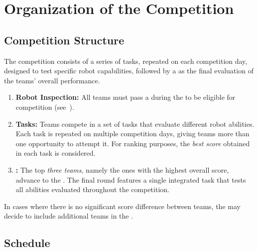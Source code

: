 \section{Organization of the Competition}\label{sec:procedure_during_competition}

\subsection{Competition Structure}\label{rule:structure}

The competition consists of a series of tasks, repeated on each competition day, designed to test specific robot capabilities, followed by a \FINAL{} as the final evaluation of the teams' overall performance.


\begin{enumerate}
	\item \textbf{Robot Inspection:} 
	All teams must pass a \RobotInspection{} during the \SetupDays{} to be eligible for competition (see~).

	\item \textbf{Tasks:}
	Teams compete in a set of tasks that evaluate different robot abilities.
	Each task is repeated on multiple competition days, giving teams more than one opportunity to attempt it.
	For ranking purposes, the \emph{best score} obtained in each task is considered.

	\item \textbf{\FINAL:} The top \emph{three teams}, namely the ones with the highest overall score, advance to the \FINAL{}.
	The final round features a single integrated task that tests all abilities evaluated throughout the competition.
\end{enumerate}

In cases where there is no significant score difference between teams, the \TC{} may decide to include additional teams in the \FINAL{}.

\subsection{Schedule}\label{rule:schedule}

